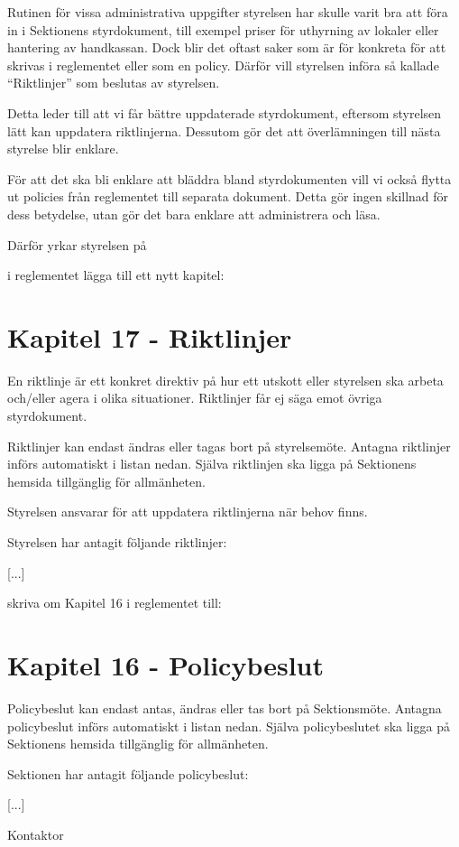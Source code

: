 \documentclass[../_main/handlingar.tex]{subfiles}
\begin{document}

Rutinen för vissa administrativa uppgifter styrelsen har skulle varit bra att föra in i Sektionens styrdokument, till exempel priser för uthyrning av lokaler eller hantering av handkassan. Dock blir det oftast saker som är för konkreta för att skrivas i reglementet eller som en policy. Därför vill styrelsen införa så kallade ``Riktlinjer'' som beslutas av styrelsen.

Detta leder till att vi får bättre uppdaterade styrdokument, eftersom styrelsen lätt kan uppdatera riktlinjerna. Dessutom gör det att överlämningen till nästa styrelse blir enklare.

För att det ska bli enklare att bläddra bland styrdokumenten vill vi också flytta ut policies från reglementet till separata dokument. Detta gör ingen skillnad för dess betydelse, utan gör det bara enklare att administrera och läsa.

Därför yrkar styrelsen på
\begin{attsatser}
    \att i reglementet lägga till ett nytt kapitel:\par
    {\it
    \section*{Kapitel 17 - Riktlinjer}
    En riktlinje är ett konkret direktiv på hur ett utskott eller styrelsen ska arbeta och/eller agera i olika situationer. Riktlinjer får ej säga emot övriga styrdokument.

    Riktlinjer kan endast ändras eller tagas bort på styrelsemöte. Antagna riktlinjer införs automatiskt i listan nedan. Själva riktlinjen ska ligga på Sektionens hemsida tillgänglig för allmänheten.

    Styrelsen ansvarar för att uppdatera riktlinjerna när behov finns.

    Styrelsen har antagit följande riktlinjer:
    \begin{dashlist}
        \item {[...]}
    \end{dashlist}
    }
    \att skriva om Kapitel 16 i reglementet till:\par
    {\it
    \section*{Kapitel 16 - Policybeslut}
    Policybeslut kan endast antas, ändras eller tas bort på Sektionsmöte. Antagna policybeslut införs automatiskt i listan nedan. Själva policybeslutet ska ligga på Sektionens hemsida tillgänglig för allmänheten.

    Sektionen har antagit följande policybeslut:
    \begin{dashlist}
        \item {[...]}
    \end{dashlist}
    }
\end{attsatser}

\begin{signatures}{1}
    \ist
    \signature{Erik Månsson}{Kontaktor}
\end{signatures}
\end{document}
